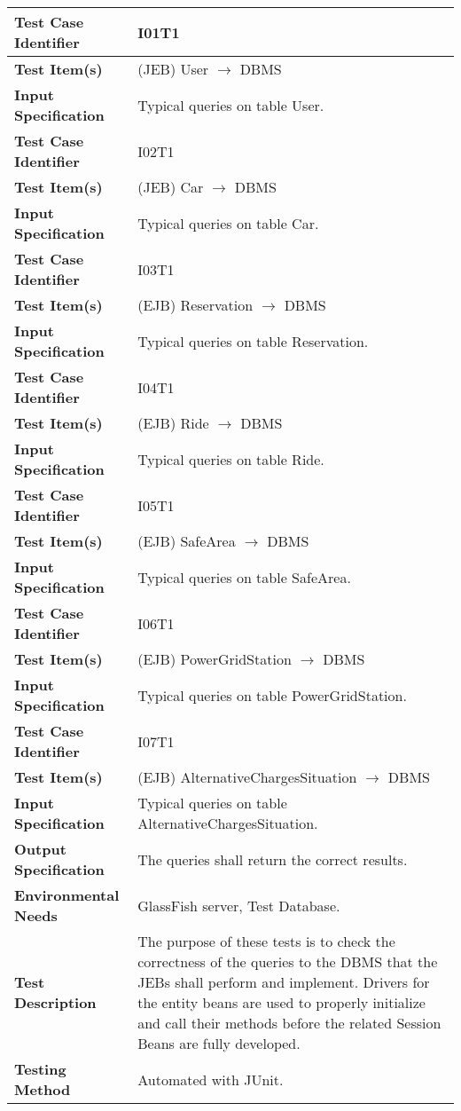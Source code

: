 \begin{longtable}{p{} | p{}}
\hline
\textbf{Test Case Identifier} & I01T1\\
\hline
\textbf{Test Item(s)} & (JEB) User $\rightarrow$ DBMS \\
\hline
\textbf{Input Specification} & Typical queries on table User. \\
\hline
\hline
\textbf{Test Case Identifier} & I02T1\\
\hline
\textbf{Test Item(s)} & (JEB) Car $\rightarrow$ DBMS \\
\hline
\textbf{Input Specification} & Typical queries on table Car. \\
\hline
\hline
\textbf{Test Case Identifier} & I03T1\\
\hline
\textbf{Test Item(s)} & (EJB) Reservation $\rightarrow$ DBMS \\
\hline
\textbf{Input Specification} & Typical queries on table Reservation. \\
\hline
\hline
\textbf{Test Case Identifier} & I04T1\\
\hline
\textbf{Test Item(s)} & (EJB) Ride $\rightarrow$ DBMS \\
\hline
\textbf{Input Specification} & Typical queries on table Ride. \\
\hline
\hline
\textbf{Test Case Identifier} & I05T1\\
\hline
\textbf{Test Item(s)} & (EJB) SafeArea $\rightarrow$ DBMS \\
\hline
\textbf{Input Specification} & Typical queries on table SafeArea. \\
\hline
\hline
\textbf{Test Case Identifier} & I06T1\\
\hline
\textbf{Test Item(s)} & (EJB) PowerGridStation $\rightarrow$ DBMS \\
\hline
\textbf{Input Specification} & Typical queries on table PowerGridStation. \\
\hline
\hline
\textbf{Test Case Identifier} & I07T1\\
\hline
\textbf{Test Item(s)} & (EJB) AlternativeChargesSituation $\rightarrow$ DBMS \\
\hline
\textbf{Input Specification} & Typical queries on table AlternativeChargesSituation. \\
\hline
\hline
\textbf{Output Specification} & The queries shall return the correct results. \\
\hline
\textbf{Environmental Needs} & GlassFish server, Test Database. \\
\hline
\textbf{Test Description} & The purpose of these tests is to check the correctness of the queries to the DBMS that the JEBs shall perform and implement. Drivers for the entity beans are used to properly initialize and call their methods before the related Session Beans are fully developed. \\
\hline
\textbf{Testing Method} & Automated with JUnit. \\
\hline
\end{longtable}

